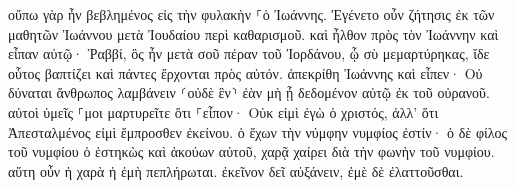 \documentclass{openreader}
\begin{document}
οὔπω γὰρ ἦν βεβλημένος εἰς τὴν φυλακὴν ⸀ὁ Ἰωάννης. 
Ἐγένετο οὖν ζήτησις ἐκ τῶν μαθητῶν Ἰωάννου μετὰ Ἰουδαίου περὶ καθαρισμοῦ. 
καὶ ἦλθον πρὸς τὸν Ἰωάννην καὶ εἶπαν αὐτῷ· Ῥαββί, ὃς ἦν μετὰ σοῦ πέραν τοῦ Ἰορδάνου, ᾧ σὺ μεμαρτύρηκας, ἴδε οὗτος βαπτίζει καὶ πάντες ἔρχονται πρὸς αὐτόν. 
ἀπεκρίθη Ἰωάννης καὶ εἶπεν· Οὐ δύναται ἄνθρωπος λαμβάνειν ⸂οὐδὲ ἓν⸃ ἐὰν μὴ ᾖ δεδομένον αὐτῷ ἐκ τοῦ οὐρανοῦ. 
αὐτοὶ ὑμεῖς ⸀μοι μαρτυρεῖτε ὅτι ⸀εἶπον· Οὐκ εἰμὶ ἐγὼ ὁ χριστός, ἀλλ’ ὅτι Ἀπεσταλμένος εἰμὶ ἔμπροσθεν ἐκείνου. 
ὁ ἔχων τὴν νύμφην νυμφίος ἐστίν· ὁ δὲ φίλος τοῦ νυμφίου ὁ ἑστηκὼς καὶ ἀκούων αὐτοῦ, χαρᾷ χαίρει διὰ τὴν φωνὴν τοῦ νυμφίου. αὕτη οὖν ἡ χαρὰ ἡ ἐμὴ πεπλήρωται. 
ἐκεῖνον δεῖ αὐξάνειν, ἐμὲ δὲ ἐλαττοῦσθαι. 
\end{document}
